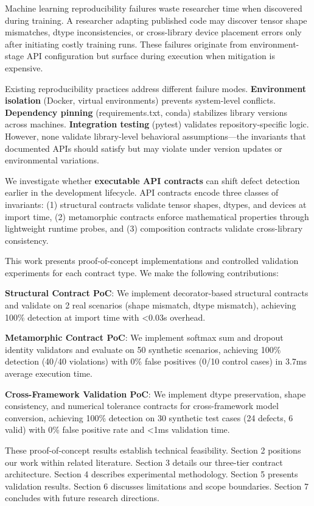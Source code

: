
Machine learning reproducibility failures waste researcher time when discovered during training. A researcher adapting published code may discover tensor shape mismatches, dtype inconsistencies, or cross-library device placement errors only after initiating costly training runs. These failures originate from environment-stage API configuration but surface during execution when mitigation is expensive.

Existing reproducibility practices address different failure modes. \textbf{Environment isolation} (Docker, virtual environments) prevents system-level conflicts. \textbf{Dependency pinning} (requirements.txt, conda) stabilizes library versions across machines. \textbf{Integration testing} (pytest) validates repository-specific logic. However, none validate library-level behavioral assumptions---the invariants that documented APIs should satisfy but may violate under version updates or environmental variations.

We investigate whether \textbf{executable API contracts} can shift defect detection earlier in the development lifecycle. API contracts encode three classes of invariants: (1) structural contracts validate tensor shapes, dtypes, and devices at import time, (2) metamorphic contracts enforce mathematical properties through lightweight runtime probes, and (3) composition contracts validate cross-library consistency.

This work presents proof-of-concept implementations and controlled validation experiments for each contract type. We make the following contributions:

\textbf{Structural Contract PoC}: We implement decorator-based structural contracts and validate on 2 real scenarios (shape mismatch, dtype mismatch), achieving 100\% detection at import time with <0.03s overhead.

\textbf{Metamorphic Contract PoC}: We implement softmax sum and dropout identity validators and evaluate on 50 synthetic scenarios, achieving 100\% detection (40/40 violations) with 0\% false positives (0/10 control cases) in 3.7ms average execution time.

\textbf{Cross-Framework Validation PoC}: We implement dtype preservation, shape consistency, and numerical tolerance contracts for cross-framework model conversion, achieving 100\% detection on 30 synthetic test cases (24 defects, 6 valid) with 0\% false positive rate and <1ms validation time.

These proof-of-concept results establish technical feasibility. Section 2 positions our work within related literature. Section 3 details our three-tier contract architecture. Section 4 describes experimental methodology. Section 5 presents validation results. Section 6 discusses limitations and scope boundaries. Section 7 concludes with future research directions.
